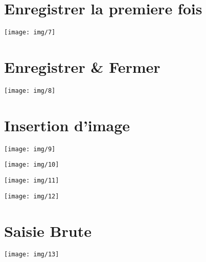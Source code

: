 \documentclass[a4paper, 12pt, twoside,openright]{report}
\begin{document}
\part{Enregistrer la premiere fois}
\begin{landscape} 		
	\texttt{[image: img/7]}
\end{landscape}

\part{Enregistrer \& Fermer}


\begin{landscape} 		
	\texttt{[image: img/8]}
\end{landscape}

\part{Insertion d'image}
\begin{landscape} 		
	\texttt{[image: img/9]}
\end{landscape}
\begin{landscape} 		
	\texttt{[image: img/10]}
\end{landscape}
\begin{landscape} 		
	\texttt{[image: img/11]}
\end{landscape}
\begin{landscape} 		
	\texttt{[image: img/12]}
\end{landscape}

\part{Saisie Brute}
\begin{landscape} 		
	\texttt{[image: img/13]}
\end{landscape}
\end{document}
